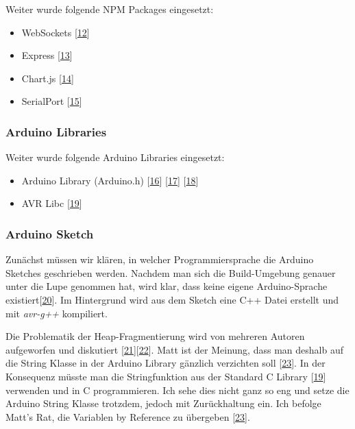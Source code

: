 \documentclass[
  ngerman,
  a4paper,
  12pt]{scrartcl}
\providecommand{\tightlist}{%
  \setlength{\itemsep}{0pt}\setlength{\parskip}{0pt}}
\begin{document}
Weiter wurde folgende NPM Packages eingesetzt:

\begin{itemize}
\tightlist
\item
  WebSockets {[}\protect\hyperlink{ref-websockets}{12}{]}
\item
  Express {[}\protect\hyperlink{ref-express}{13}{]}
\item
  Chart.js {[}\protect\hyperlink{ref-chartjs}{14}{]}
\item
  SerialPort {[}\protect\hyperlink{ref-serialPort}{15}{]}
\end{itemize}

\hypertarget{arduino-libraries}{%
\subsubsection{Arduino Libraries}\label{arduino-libraries}}

Weiter wurde folgende Arduino Libraries eingesetzt:

\begin{itemize}
\tightlist
\item
  Arduino Library (Arduino.h)
  {[}\protect\hyperlink{ref-sprachreferenz}{16}{]}
  {[}\protect\hyperlink{ref-codeReferenz}{17}{]}
  {[}\protect\hyperlink{ref-arduinoCheatSheet}{18}{]}\\
\item
  AVR Libc {[}\protect\hyperlink{ref-avrlibc}{19}{]}
\end{itemize}

\hypertarget{arduino-sketch}{%
\subsubsection{Arduino Sketch}\label{arduino-sketch}}

Zunächst müssen wir klären, in welcher Programmiersprache die Arduino
Sketches geschrieben werden. Nachdem man sich die Build-Umgebung genauer
unter die Lupe genommen hat, wird klar, dass keine eigene
Arduino-Sprache
existiert{[}\protect\hyperlink{ref-arduinoLanguage}{20}{]}. Im
Hintergrund wird aus dem Sketch eine C++ Datei erstellt und mit
\emph{avr-g++} kompiliert.

Die Problematik der Heap-Fragmentierung wird von mehreren Autoren
aufgeworfen und diskutiert
{[}\protect\hyperlink{ref-heapFragmentation}{21}{]}{[}\protect\hyperlink{ref-heapFragmentation2}{22}{]}.
Matt ist der Meinung, dass man deshalb auf die String Klasse in der
Arduino Library gänzlich verzichten soll
{[}\protect\hyperlink{ref-arduinoStrings}{23}{]}. In der Konsequenz
müsste man die Stringfunktion aus der Standard C Library
{[}\protect\hyperlink{ref-avrlibc}{19}{]} verwenden und in C
programmieren. Ich sehe dies nicht ganz so eng und setze die Arduino
String Klasse trotzdem, jedoch mit Zurückhaltung ein. Ich befolge Matt's
Rat, die Variablen by Reference zu übergeben
{[}\protect\hyperlink{ref-arduinoStrings}{23}{]}.
\end{document}
